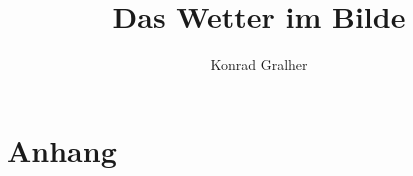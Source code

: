 \documentclass[fontzize=12pt,paper=a4,twoside=false]{amsart}
\title{Das Wetter im Bilde}
\author{Konrad Gralher}
\begin{document}
        
    
    


    

    \part*{Anhang}
    
    
    
\end{document}
